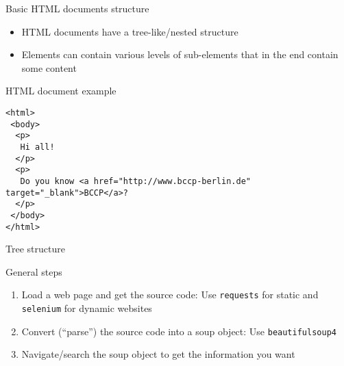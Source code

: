 \begin{frame}{Basic HTML documents structure}
\begin{itemize}
	\item HTML documents have a tree-like/nested structure
	\item Elements can contain various levels of sub-elements that in the end contain some content
\end{itemize}
\end{frame}

\begin{frame}[fragile]{HTML document example}
\begin{verbatim}
<html>
 <body>
  <p>
   Hi all!
  </p>
  <p>
   Do you know <a href="http://www.bccp-berlin.de" target="_blank">BCCP</a>?
  </p>
 </body>
</html>
\end{verbatim}
\end{frame}

\begin{frame}[fragile]{Tree structure}
\begin{center}
\end{center}
\end{frame}

\begin{frame}[fragile]{General steps}
\begin{enumerate}
	\item Load a web page and get the source code: Use \texttt{requests} for static and \texttt{selenium} for dynamic websites
	\item Convert (``parse'') the source code into a soup object: Use \texttt{beautifulsoup4}
	\item Navigate/search the soup object to get the information you want
\end{enumerate}
\end{frame}


